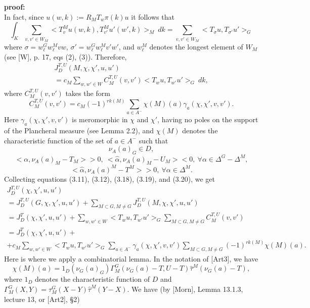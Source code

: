 \documentclass[12pt]{article}
\newenvironment{pf}[1][proof:]{\par\medskip\noindent\textbf{#1} }{\par\medskip}
\begin{document}
\begin{pf}
\begin{equation}
\end{equation}
In fact, since $u(w,k):=R_MT_w\pi(k)u$ it follows that
\[
\int_K\sum_{v,v'\in W_M}<T^M_vu(w,k),T^M_{v'}u'(w',k)>_M\ dk=\sum_{v,v'\in W_M}<T_\sigma u,T_{\sigma'}u'>_G
\]
where $\sigma=w^G_\ell w^M_\ell vw$, $\sigma'=w^G_\ell w^M_\ell v'w'$, and $w_\ell^M$ denotes the longest element of $W_M$ (see [W], p. 17, eqs (2), (3)). Therefore,
\begin{equation}\tag{3.19}
\begin{array}{c}
J^{T,U}_D(M,\chi,\chi',u,u')\\
=c_M\sum_{w,w'\in W}C^{T,U}_M(v,v')<T_wu,T_{w'}u'>_G\ dk,
\end{array}
\end{equation}
where $C^{T,U}_M(v,v')$ takes the form
\begin{equation}\tag{3.20}
C^{T,U}_M(v,v')=c_M(-1)^{rk(M)}\sum_{a\in A^-}\chi(M)(a)\gamma_a(\chi,\chi',v,v').
\end{equation}
Here $\gamma_a(\chi,\chi',v,v')$ is meromorphic in $\chi$ and $\chi'$, having no poles on the support of the Plancheral measure (see Lemma 2.2), and $\chi(M)$ denotes the characteristic function of the set of $a\in A^-$ such that
\[
\nu_A(a)_G\in D,
\]
\[
<\alpha,\nu_A(a)_M-T_M>>0,\ <\hat\alpha,\nu_A(a)_M-U_M><0,\ \forall\alpha\in\Delta^G-\Delta^M,
\]
\[
<\hat\alpha,\nu_A(a)^M-T^M>>0,\ \forall\alpha\in\Delta^M.
\]
Collecting equations (3.11), (3.12), (3.18), (3.19), and (3.20), we get
\begin{equation}\tag{3.21}
\begin{array}{c}
J^{T,U}_D(\chi,\chi',u,u')\\
=J^{T,U}_D(G,\chi,\chi',u,u')+\sum_{M\subset G,M\neq G}J^{T,U}_D(M,\chi,\chi',u,u')\\
=J^T_D(\chi,\chi',u,u')+\sum_{w,w'\in W}<T_wu,T_{w'}u'>_G\sum_{M\subset G,M\neq G}C^{T,U}_M(v,v')\\
=J^T_D(\chi,\chi',u,u')+\\
+c_M\sum_{w,w'\in W}<T_wu,T_{w'}u'>_G\sum_{a\in A^-}\gamma_a(\chi,\chi',v,v')\sum_{M\subset G,M\neq G}(-1)^{rk(M)}\chi(M)(a).
\end{array}
\end{equation}
Here is where we apply a combinatorial lemma. In the notation of [Art3], we have
\begin{equation}\tag{3.22}
\chi(M)(a)=1_D(\nu_G(a)_G)\Gamma^G_M(\nu_G(a)-T,U-T)\hat\tau^M(\nu_G(a)-T),
\end{equation}
where $1_D$ denotes the characteristic function of $D$ and $\Gamma^G_M(X,Y)=\tau^G_M(X-Y)\hat\tau^M(Y-X)$. We have (by [Morn], Lemma 13.1.3, lecture 13, or [Art2], \S2)

\end{pf}
\end{document}
